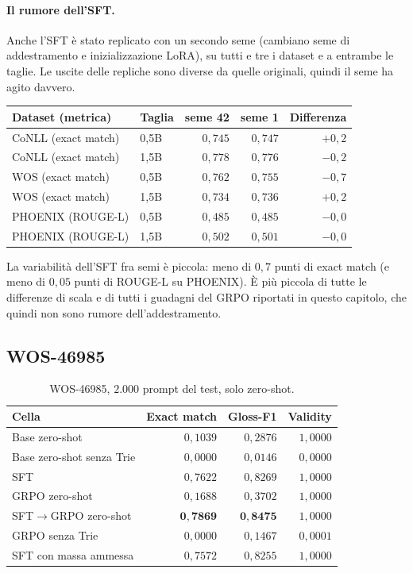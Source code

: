 \paragraph{Il rumore dell'SFT.} Anche l'SFT è stato replicato con un secondo
seme (cambiano seme di addestramento e inizializzazione LoRA), su tutti e tre i
dataset e a entrambe le taglie. Le uscite delle repliche sono diverse da quelle
originali, quindi il seme ha agito davvero.

\begin{center}
\small
\begin{tabular}{llrrr}
\toprule
Dataset (metrica) & Taglia & seme 42 & seme 1 & Differenza \\
\midrule
CoNLL (exact match)  & 0,5B & $0{,}745$ & $0{,}747$ & $+0{,}2$ \\
CoNLL (exact match)  & 1,5B & $0{,}778$ & $0{,}776$ & $-0{,}2$ \\
WOS (exact match)    & 0,5B & $0{,}762$ & $0{,}755$ & $-0{,}7$ \\
WOS (exact match)    & 1,5B & $0{,}734$ & $0{,}736$ & $+0{,}2$ \\
PHOENIX (ROUGE-L)    & 0,5B & $0{,}485$ & $0{,}485$ & $-0{,}0$ \\
PHOENIX (ROUGE-L)    & 1,5B & $0{,}502$ & $0{,}501$ & $-0{,}0$ \\
\bottomrule
\end{tabular}
\end{center}

La variabilità dell'SFT fra semi è piccola: meno di $0{,}7$ punti di exact match
(e meno di $0{,}05$ punti di ROUGE-L su PHOENIX). È più piccola di tutte le
differenze di scala e di tutti i guadagni del GRPO riportati in questo
capitolo, che quindi non sono rumore dell'addestramento.


\subsection{WOS-46985}

\begin{table}[h]
\centering
\small
\begin{tabular}{lrrr}
\toprule
Cella & Exact match & Gloss-F1 & Validity \\
\midrule
Base zero-shot                 & $0{,}1039$ & $0{,}2876$ & $1{,}0000$ \\
Base zero-shot senza Trie      & $0{,}0000$ & $0{,}0146$ & $0{,}0000$ \\
SFT                            & $0{,}7622$ & $0{,}8269$ & $1{,}0000$ \\
GRPO zero-shot                 & $0{,}1688$ & $0{,}3702$ & $1{,}0000$ \\
SFT$\to$GRPO zero-shot         & $\mathbf{0{,}7869}$ & $\mathbf{0{,}8475}$ & $1{,}0000$ \\
GRPO senza Trie                & $0{,}0000$ & $0{,}1467$ & $0{,}0001$ \\
SFT con massa ammessa          & $0{,}7572$ & $0{,}8255$ & $1{,}0000$ \\
\bottomrule
\end{tabular}
\caption{WOS-46985, $2.000$ prompt del test, solo zero-shot.}
\label{tab:risultati-wos}
\end{table}

